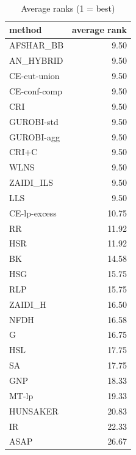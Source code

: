 \begin{table}[htbp]
\centering
\small
\caption{Average ranks (1 = best)}
\label{tab:E0_sanity_b5_ranks}
\begin{tabular}{lr}
\toprule
method & average rank \\
\midrule
AFSHAR\_BB & 9.50 \\
AN\_HYBRID & 9.50 \\
CE-cut-union & 9.50 \\
CE-conf-comp & 9.50 \\
CRI & 9.50 \\
GUROBI-std & 9.50 \\
GUROBI-agg & 9.50 \\
CRI+C & 9.50 \\
WLNS & 9.50 \\
ZAIDI\_ILS & 9.50 \\
LLS & 9.50 \\
CE-lp-excess & 10.75 \\
RR & 11.92 \\
HSR & 11.92 \\
BK & 14.58 \\
HSG & 15.75 \\
RLP & 15.75 \\
ZAIDI\_H & 16.50 \\
NFDH & 16.58 \\
G & 16.75 \\
HSL & 17.75 \\
SA & 17.75 \\
GNP & 18.33 \\
MT-lp & 19.33 \\
HUNSAKER & 20.83 \\
IR & 22.33 \\
ASAP & 26.67 \\
\bottomrule
\end{tabular}
\end{table}

